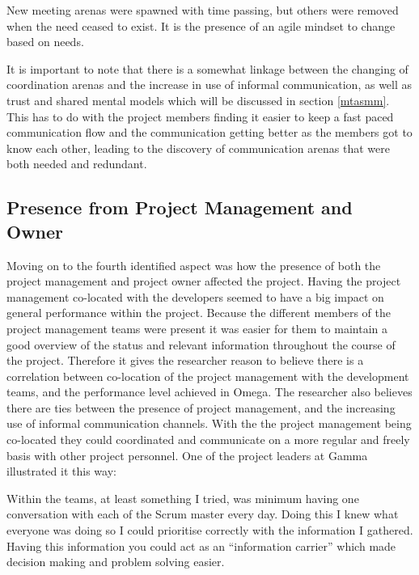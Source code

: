 \begin{fancyquotes}
New meeting arenas were spawned with time passing, but others were removed when the need ceased to exist. It is the presence of an agile mindset to change based on needs.
\end{fancyquotes}

It is important to note that there is a somewhat linkage between the changing of coordination arenas and the increase in use of informal communication, as well as trust and shared mental models which will be discussed in section \ref{mtasmm}. This has to do with the project members finding it easier to keep a fast paced communication flow and the communication getting better as the members got to know each other, leading to the discovery of communication arenas that were both needed and redundant.

\subsection{Presence from Project Management and Owner}

Moving on to the fourth identified aspect was how the presence of both the project management and project owner affected the project. Having the project management co-located with the developers seemed to have a big impact on general performance within the project. Because the different members of the project management teams were present it was easier for them to maintain a good overview of the status and relevant information throughout the course of the project. Therefore it gives the researcher reason to believe there is a correlation between co-location of the project management with the development teams, and the performance level achieved in Omega. The researcher also believes there are ties between the presence of project management, and the increasing use of informal communication channels. With the the project management being co-located they could coordinated and communicate on a more regular and freely basis with other project personnel. One of the project leaders at Gamma illustrated it this way:

\begin{fancyquotes}
Within the teams, at least something I tried, was minimum having one conversation with each of the Scrum master every day. Doing this I knew what everyone was doing so I could prioritise correctly with the information I gathered. Having this information you could act as an ``information carrier'' which made decision making and problem solving easier.
\end{fancyquotes}

